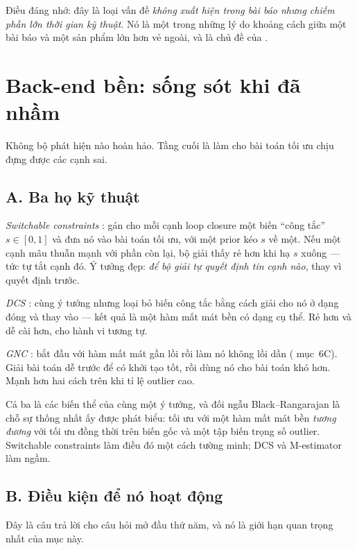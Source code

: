 \documentclass[../../vslam.tex]{subfiles}
\begin{document}
Điều đáng nhớ: đây là loại vấn đề \emph{không xuất hiện trong bài báo nhưng chiếm phần lớn thời gian kỹ thuật}. Nó là một trong những lý do khoảng cách giữa một bài báo và một sản phẩm lớn hơn vẻ ngoài, và là chủ đề của .

\section{Back-end bền: sống sót khi đã nhầm}

Không bộ phát hiện nào hoàn hảo. Tầng cuối là làm cho bài toán tối ưu chịu đựng được các cạnh sai.

\subsection{A. Ba họ kỹ thuật}

\emph{Switchable constraints} \cite{sunderhauf2012switchable}: gán cho mỗi cạnh loop closure một biến ``công tắc'' \(s \in [0,1]\) và đưa nó vào bài toán tối ưu, với một prior kéo \(s\) về một. Nếu một cạnh mâu thuẫn mạnh với phần còn lại, bộ giải thấy rẻ hơn khi hạ \(s\) xuống --- tức tự tắt cạnh đó. Ý tưởng đẹp: \emph{để bộ giải tự quyết định tin cạnh nào}, thay vì quyết định trước.

\emph{DCS} \cite{agarwal2013dcs}: cùng ý tưởng nhưng loại bỏ biến công tắc bằng cách giải cho nó ở dạng đóng và thay vào --- kết quả là một hàm mất mát bền có dạng cụ thể. Rẻ hơn và dễ cài hơn, cho hành vi tương tự.

\emph{GNC} \cite{yang2020gnc}: bắt đầu với hàm mất mát gần lồi rồi làm nó không lồi dần ( mục~6C). Giải bài toán dễ trước để có khởi tạo tốt, rồi dùng nó cho bài toán khó hơn. Mạnh hơn hai cách trên khi tỉ lệ outlier cao.

Cả ba là các biến thể của cùng một ý tưởng, và đối ngẫu Black--Rangarajan \cite{blackrangarajan1996} là chỗ sự thống nhất ấy được phát biểu: tối ưu với một hàm mất mát bền \emph{tương đương} với tối ưu đồng thời trên biến gốc và một tập biến trọng số outlier. Switchable constraints làm điều đó một cách tường minh; DCS và M-estimator làm ngầm.

\subsection{B. Điều kiện để nó hoạt động}

Đây là câu trả lời cho câu hỏi mở đầu thứ năm, và nó là giới hạn quan trọng nhất của mục này.
\end{document}
